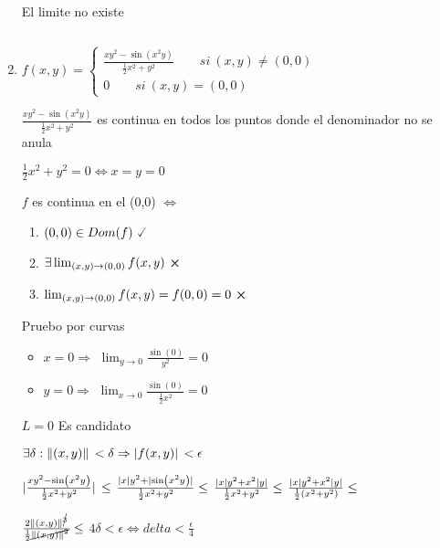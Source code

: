 \documentclass[../practica_03.tex]{subfiles}
\begin{document}
\begin{enumerate}
            El limite no existe

        $ $

        \item $f(x,y) = \left\{
            \begin{array}{ll}
                \frac{xy^2-\sin(x^2y)}{\frac{1}{2}x^2 +y^2} \qquad si\ (x,y)\neq(0,0)\\
                0 \qquad si\ (x,y) = (0,0)
            \end{array}
        \right.$

        $\frac{xy^2-\sin(x^2y)}{\frac{1}{2}x^2 +y^2}$ es continua en todos los puntos donde el denominador no se anula

        $ \frac{1}{2}x^2 +y^2 = 0 \Leftrightarrow x = y = 0 $

        $f$ es continua en el (0,0) $\Leftrightarrow$

        \begin{enumerate}
            \item $(0,0) \in Dom(f)\ \checked$
            \item $\exists \lim_{(x,y)\to (0,0)} f(x,y)\ \crossproduct$
            \item $\lim_{(x,y)\to (0,0)} f(x,y) = f(0,0) = 0\ \crossproduct $
        \end{enumerate}

        Pruebo por curvas

        \begin{itemize} %
            \item $x = 0 \Rightarrow$
                $\lim_{y\to 0} \frac{\sin(0)}{y^2} = 0$
            \item $y = 0 \Rightarrow$
                $\lim_{x\to 0} \frac{\sin(0)}{\frac{1}{2}x^2} = 0$
        \end{itemize}

        $L = 0$ Es candidato

        $ \exists \delta : \norm*{(x,y)} < \delta \Rightarrow \abs*{f(x,y)} < \epsilon $

        $ \abs*{\frac{xy^2-\sin(x^2y)}{\frac{1}{2}x^2 +y^2}} \leq $
        $ \frac{\abs*{x}y^2+\abs*{\sin(x^2y)}}{\frac{1}{2}x^2 +y^2} \leq$
        $ \frac{\abs*{x}y^2+x^2\abs*{y}}{\frac{1}{2}x^2 +y^2} \leq$
        $ \frac{\abs*{x}y^2+x^2\abs*{y}}{\frac{1}{2}(x^2 +y^2)} \leq $

        $ \frac{2\norm*{(x,y)}^{\cancel{3}}}{\frac{1}{2}\cancel{\norm*{(x,y)}^2}} \leq $
        $ 4\delta < \epsilon \Leftrightarrow delta < \frac{\epsilon}{4} $

    \end{enumerate}
\end{document}
